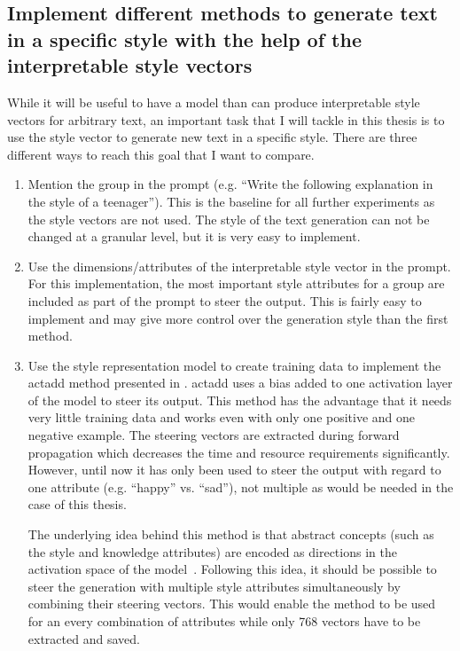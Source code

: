 \subsection{Implement different methods to generate text in a specific style with the help of the interpretable style vectors}
While it will be useful to have a model than can produce interpretable style vectors for arbitrary text, an important task that I will tackle in this thesis is to use the style vector to generate new text in a specific style. There are three different ways to reach this goal that I want to compare.
\begin{enumerate}
	\item
	      Mention the group in the prompt (e.g. \enquote{Write the following explanation in the style of a teenager}). This is the baseline for all further experiments as the style vectors are not used. The style of the text generation can not be changed at a granular level, but it is very easy to implement.
	\item
	      Use the dimensions/attributes of the interpretable style vector in the prompt. For this implementation, the most important style attributes for a group are included as part of the prompt to steer the output. This is fairly easy to implement and may give more control over the generation style than the first method.
	\item
	      Use the style representation model to create training data to implement the \ac{actadd} method presented in \citet{rimsky-etal-2024-steering,turnerActivationAdditionSteering2024}. \Ac{actadd} uses a bias added to one activation layer of the model to steer its output. This method has the advantage that it needs very little training data and works even with only one positive and one negative example. The steering vectors are extracted during forward propagation which decreases the time and resource requirements significantly. However, until now it has only been used to steer the output with regard to one attribute (e.g. \enquote{happy} vs. \enquote{sad}), not multiple as would be needed in the case of this thesis.

	      The underlying idea behind this method is that abstract concepts (such as the style and knowledge attributes) are encoded as directions in the activation space of the model~\cite{parkLinearRepresentationHypothesis2024,rimsky-etal-2024-steering}. Following this idea, it should be possible to steer the generation with multiple style attributes simultaneously by combining their steering vectors. This would enable the method to be used for an every combination of attributes while only 768 vectors have to be extracted and saved.
\end{enumerate}

